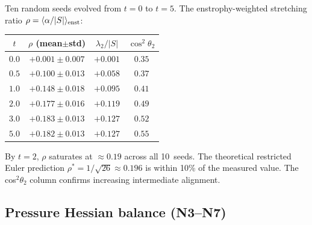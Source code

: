 \documentclass[11pt,a4paper]{article}
\theoremstyle{plain}
\theoremstyle{definition}
\theoremstyle{remark}
\begin{document}
Ten random seeds evolved from $t=0$ to $t=5$.
The enstrophy-weighted stretching ratio
$\rho = \langle\alpha/|S|\rangle_{\rm enst}$:
\begin{center}
\renewcommand{\arraystretch}{1.2}
\begin{tabular}{@{}cccc@{}}
\toprule
$t$ & $\rho$ (mean$\pm$std)
  & $\lambda_2/|S|$ & $\cos^2\theta_2$ \\
\midrule
$0.0$ & $+0.001\pm 0.007$ & $+0.001$ & $0.35$ \\
$0.5$ & $+0.100\pm 0.013$ & $+0.058$ & $0.37$ \\
$1.0$ & $+0.148\pm 0.018$ & $+0.095$ & $0.41$ \\
$2.0$ & $+0.177\pm 0.016$ & $+0.119$ & $0.49$ \\
$3.0$ & $+0.183\pm 0.013$ & $+0.127$ & $0.52$ \\
$5.0$ & $+0.182\pm 0.013$ & $+0.127$ & $0.55$ \\
\bottomrule
\end{tabular}
\end{center}
By $t=2$, $\rho$ saturates at $\approx 0.19$
across all 10~seeds.  The theoretical restricted
Euler prediction $\rho^*=1/\sqrt{26}\approx 0.196$
is within 10\% of the measured value.  The cos$^2\theta_2$
column confirms increasing intermediate alignment.

\subsection{Pressure Hessian balance (N3--N7)}
\end{document}
